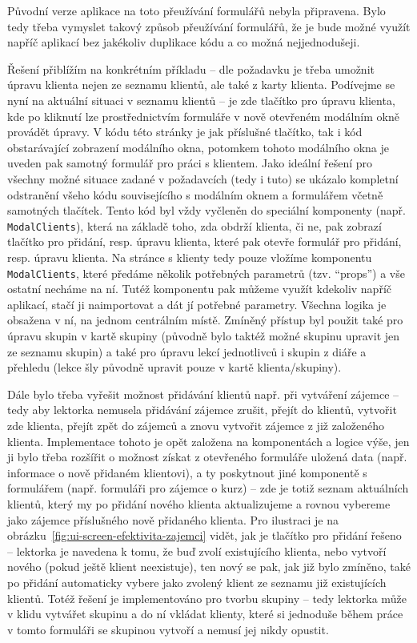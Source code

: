 Původní verze aplikace na toto přeužívání formulářů nebyla připravena. Bylo tedy třeba vymyslet takový způsob přeužívání formulářů, že je bude možné využít napříč aplikací bez jakékoliv duplikace kódu a co možná nejjednodušeji.

Řešení přiblížím na konkrétním příkladu -- dle požadavku je třeba umožnit úpravu klienta nejen ze seznamu klientů, ale také z karty klienta. Podívejme se nyní na aktuální situaci v seznamu klientů -- je zde tlačítko pro úpravu klienta, kde po kliknutí lze prostřednictvím formuláře v nově otevřeném modálním okně provádět úpravy. V kódu této stránky je jak příslušné tlačítko, tak i kód obstarávající zobrazení modálního okna, potomkem tohoto modálního okna je uveden pak samotný formulář pro práci s klientem. Jako ideální řešení pro všechny možné situace zadané v požadavcích (tedy i tuto) se ukázalo kompletní odstranění všeho kódu souvisejícího s modálním oknem a formulářem včetně samotných tlačítek. Tento kód byl vždy vyčleněn do speciální komponenty (např. \verb|ModalClients|), která na základě toho, zda obdrží klienta, či ne, pak zobrazí tlačítko pro přidání, resp. úpravu klienta, které pak otevře formulář pro přidání, resp. úpravu klienta. Na stránce s klienty tedy pouze vložíme komponentu \verb|ModalClients|, které předáme několik potřebných parametrů (tzv. \enquote{props}) a vše ostatní necháme na ní. Tutéž komponentu pak můžeme využít kdekoliv napříč aplikací, stačí ji naimportovat a dát jí potřebné parametry. Všechna logika je obsažena v ní, na jednom centrálním místě. Zmíněný přístup byl použit také pro úpravu skupin v kartě skupiny (původně bylo taktéž možné skupinu upravit jen ze seznamu skupin) a také pro úpravu lekcí jednotlivců i skupin z diáře a přehledu (lekce šly původně upravit pouze v kartě klienta/skupiny). 

Dále bylo třeba vyřešit možnost přidávání klientů např. při vytváření zájemce -- tedy aby lektorka nemusela přidávání zájemce zrušit, přejít do klientů, vytvořit zde klienta, přejít zpět do zájemců a znovu vytvořit zájemce z již založeného klienta. Implementace tohoto je opět založena na komponentách a logice výše, jen ji bylo třeba rozšířit o možnost získat z otevřeného formuláře uložená data (např. informace o nově přidaném klientovi), a ty poskytnout jiné komponentě s formulářem (např. formuláři pro zájemce o kurz) -- zde je totiž seznam aktuálních klientů, který my po přidání nového klienta aktualizujeme a rovnou vybereme jako zájemce příslušného nově přidaného klienta. Pro ilustraci je na obrázku~\ref{fig:ui-screen-efektivita-zajemci} vidět, jak je tlačítko pro přidání řešeno -- lektorka je navedena k tomu, že buď zvolí existujícího klienta, nebo vytvoří nového (pokud ještě klient neexistuje), ten nový se pak, jak již bylo zmíněno, také po přidání automaticky vybere jako zvolený klient ze seznamu již existujících klientů. Totéž řešení je implementováno pro tvorbu skupiny -- tedy lektorka může v klidu vytvářet skupinu a do ní vkládat klienty, které si jednoduše během práce v tomto formuláři se skupinou vytvoří a nemusí jej nikdy opustit.

